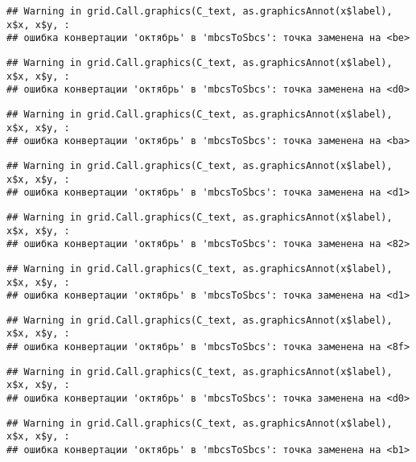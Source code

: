 \documentclass[
]{article}
\begin{document}
\begin{verbatim}
## Warning in grid.Call.graphics(C_text, as.graphicsAnnot(x$label), x$x, x$y, :
## ошибка конвертации 'октябрь' в 'mbcsToSbcs': точка заменена на <be>
\end{verbatim}

\begin{verbatim}
## Warning in grid.Call.graphics(C_text, as.graphicsAnnot(x$label), x$x, x$y, :
## ошибка конвертации 'октябрь' в 'mbcsToSbcs': точка заменена на <d0>
\end{verbatim}

\begin{verbatim}
## Warning in grid.Call.graphics(C_text, as.graphicsAnnot(x$label), x$x, x$y, :
## ошибка конвертации 'октябрь' в 'mbcsToSbcs': точка заменена на <ba>
\end{verbatim}

\begin{verbatim}
## Warning in grid.Call.graphics(C_text, as.graphicsAnnot(x$label), x$x, x$y, :
## ошибка конвертации 'октябрь' в 'mbcsToSbcs': точка заменена на <d1>
\end{verbatim}

\begin{verbatim}
## Warning in grid.Call.graphics(C_text, as.graphicsAnnot(x$label), x$x, x$y, :
## ошибка конвертации 'октябрь' в 'mbcsToSbcs': точка заменена на <82>
\end{verbatim}

\begin{verbatim}
## Warning in grid.Call.graphics(C_text, as.graphicsAnnot(x$label), x$x, x$y, :
## ошибка конвертации 'октябрь' в 'mbcsToSbcs': точка заменена на <d1>
\end{verbatim}

\begin{verbatim}
## Warning in grid.Call.graphics(C_text, as.graphicsAnnot(x$label), x$x, x$y, :
## ошибка конвертации 'октябрь' в 'mbcsToSbcs': точка заменена на <8f>
\end{verbatim}

\begin{verbatim}
## Warning in grid.Call.graphics(C_text, as.graphicsAnnot(x$label), x$x, x$y, :
## ошибка конвертации 'октябрь' в 'mbcsToSbcs': точка заменена на <d0>
\end{verbatim}

\begin{verbatim}
## Warning in grid.Call.graphics(C_text, as.graphicsAnnot(x$label), x$x, x$y, :
## ошибка конвертации 'октябрь' в 'mbcsToSbcs': точка заменена на <b1>
\end{verbatim}
\end{document}
